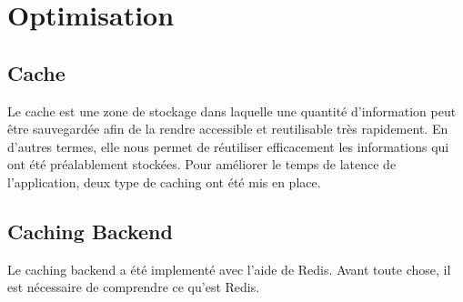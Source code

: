 \section{Optimisation}
\subsection{Cache}
Le cache est une zone de stockage dans laquelle une quantité d'information peut être sauvegardée afin de la rendre accessible et reutilisable très rapidement. En d'autres termes, elle nous permet de réutiliser efficacement les informations qui ont été préalablement stockées.
Pour améliorer le temps de latence de l'application, deux type de caching ont été mis en place.

\subsection{Caching Backend}
Le caching backend a été implementé avec l'aide de Redis. Avant toute chose, il est nécessaire de comprendre ce qu'est Redis.
